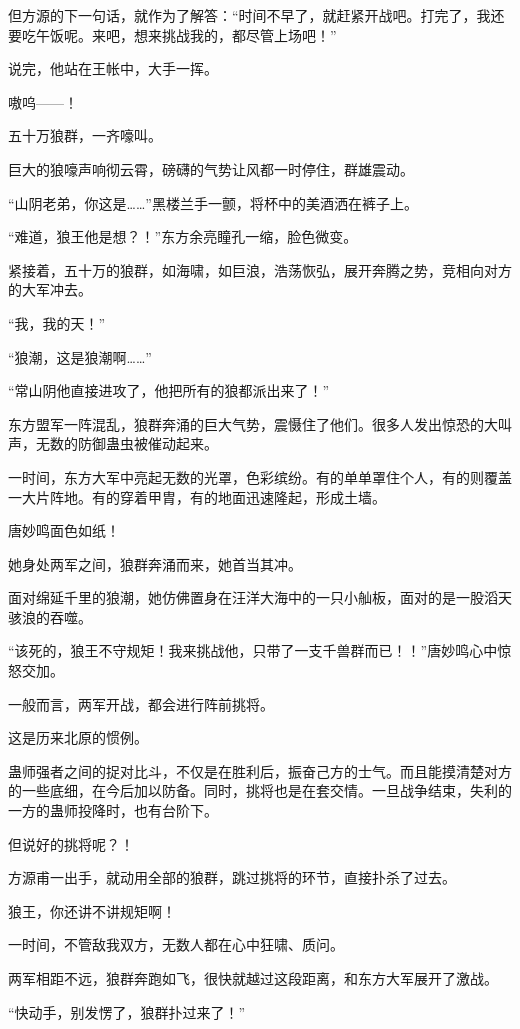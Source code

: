\begin{this_body}
但方源的下一句话，就作为了解答：“时间不早了，就赶紧开战吧。打完了，我还要吃午饭呢。来吧，想来挑战我的，都尽管上场吧！”

说完，他站在王帐中，大手一挥。

嗷呜——！

五十万狼群，一齐嚎叫。

巨大的狼嚎声响彻云霄，磅礴的气势让风都一时停住，群雄震动。

“山阴老弟，你这是……”黑楼兰手一颤，将杯中的美酒洒在裤子上。

“难道，狼王他是想？！”东方余亮瞳孔一缩，脸色微变。

紧接着，五十万的狼群，如海啸，如巨浪，浩荡恢弘，展开奔腾之势，竞相向对方的大军冲去。

“我，我的天！”

“狼潮，这是狼潮啊……”

“常山阴他直接进攻了，他把所有的狼都派出来了！”

东方盟军一阵混乱，狼群奔涌的巨大气势，震慑住了他们。很多人发出惊恐的大叫声，无数的防御蛊虫被催动起来。

一时间，东方大军中亮起无数的光罩，色彩缤纷。有的单单罩住个人，有的则覆盖一大片阵地。有的穿着甲胄，有的地面迅速隆起，形成土墙。

唐妙鸣面色如纸！

她身处两军之间，狼群奔涌而来，她首当其冲。

面对绵延千里的狼潮，她仿佛置身在汪洋大海中的一只小舢板，面对的是一股滔天骇浪的吞噬。

“该死的，狼王不守规矩！我来挑战他，只带了一支千兽群而已！！”唐妙鸣心中惊怒交加。

一般而言，两军开战，都会进行阵前挑将。

这是历来北原的惯例。

蛊师强者之间的捉对比斗，不仅是在胜利后，振奋己方的士气。而且能摸清楚对方的一些底细，在今后加以防备。同时，挑将也是在套交情。一旦战争结束，失利的一方的蛊师投降时，也有台阶下。

但说好的挑将呢？！

方源甫一出手，就动用全部的狼群，跳过挑将的环节，直接扑杀了过去。

狼王，你还讲不讲规矩啊！

一时间，不管敌我双方，无数人都在心中狂啸、质问。

两军相距不远，狼群奔跑如飞，很快就越过这段距离，和东方大军展开了激战。

“快动手，别发愣了，狼群扑过来了！”


\end{this_body}
